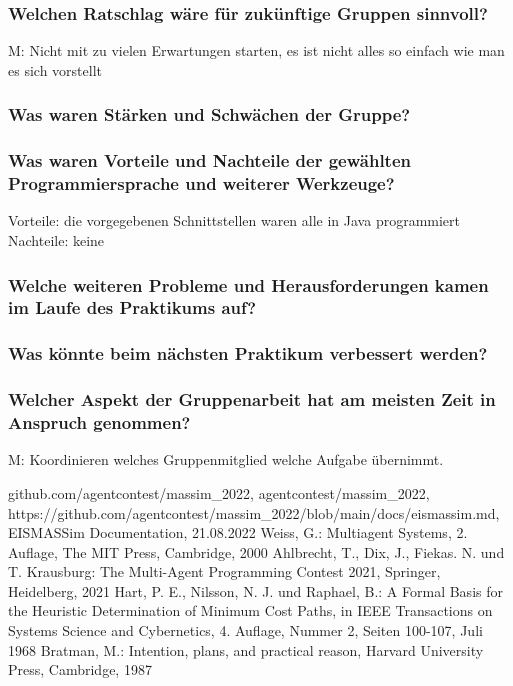\documentclass[runningheads]{llncs}
\begin{document}
\subsubsection{Welchen Ratschlag wäre für zukünftige Gruppen sinnvoll?\\}
M: Nicht mit zu vielen Erwartungen starten, es ist nicht alles so einfach wie man es sich vorstellt
\subsubsection{Was waren Stärken und Schwächen der Gruppe?\\}
\subsubsection{Was waren Vorteile und Nachteile der gewählten Programmiersprache und weiterer Werkzeuge?\\}
Vorteile: die vorgegebenen Schnittstellen waren alle in Java programmiert\\
Nachteile: keine
\subsubsection{Welche weiteren Probleme und Herausforderungen kamen im Laufe des Praktikums auf?\\}
\subsubsection{Was könnte beim nächsten Praktikum verbessert werden?\\}
\subsubsection{Welcher Aspekt der Gruppenarbeit hat am meisten Zeit in Anspruch genommen?\\}
M: Koordinieren welches Gruppenmitglied welche Aufgabe übernimmt.
%
%
%
% 
% 
%
\begin{thebibliography}{8}
	github.com/agentcontest/massim\_2022, agentcontest/massim\_2022, \\ https://github.com/agentcontest/massim\_2022/blob/main/docs/eismassim.md, EISMASSim Documentation, 21.08.2022
	Weiss, G.: Multiagent Systems, 2. Auflage, The MIT Press, Cambridge, 2000
	Ahlbrecht, T., Dix, J., Fiekas. N. und T. Krausburg: The Multi-Agent Programming Contest 2021, Springer, Heidelberg, 2021
	Hart, P. E., Nilsson, N. J. und Raphael, B.: A Formal Basis for the Heuristic Determination of Minimum Cost Paths, in IEEE Transactions on Systems Science and Cybernetics, 4. Auflage, Nummer 2, Seiten 100-107, Juli 1968
	Bratman, M.: Intention, plans, and practical reason, Harvard University Press, Cambridge, 1987
\end{thebibliography}
\end{document}
